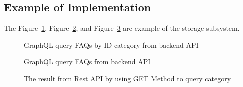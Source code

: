\documentclass[12pt,oneside,openright,a4paper]{cpe-english-project}
\begin{document}
\pagebreak
\subsection{Example of Implementation}
The Figure~\ref*{fig:GraphQL query FAQs category from backend API},
Figure~\ref*{fig:GraphQL query FAQs from backend API},
and Figure~\ref*{fig:The result from Rest API by using GET Method to query category}
are example of the storage subsystem.

\begin{figure}[!h]\centering
{}
\caption{GraphQL query FAQs by ID category from backend API}
\label{fig:GraphQL query FAQs category from backend API}
\end{figure}

\begin{figure}[!h]\centering
{}
\caption{GraphQL query FAQs from backend API}
\label{fig:GraphQL query FAQs from backend API}
\end{figure}

\begin{figure}[!h]\centering
{}
\caption{The result from Rest API by using GET Method to query category
}\label{fig:The result from Rest API by using GET Method to query category}
\end{figure}
\end{document}
